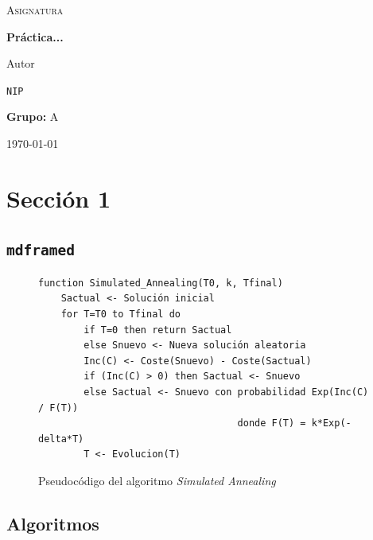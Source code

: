\documentclass[11pt]{article}
\begin{document}
    
\begin{titlepage}
	\centering
	{\scshape \LARGE Asignatura \par}
	\vspace{1cm}
	{\huge\bfseries Práctica... \par}
	\vspace{2cm}
	{\Large Autor} \par
    \texttt{NIP} \par
	\vspace{2cm}
    \textbf{Grupo: }A
    \vfill
    {\Large \today \par}
\end{titlepage}


\thispagestyle{empty}
\tableofcontents

\newpage

\section{Sección 1}

\subsection{\texttt{mdframed}}

\begin{figure}[h!] 
    \center
    \begin{mdframed}[style=code, nobreak=false]
\begin{verbatim}
function Simulated_Annealing(T0, k, Tfinal)
    Sactual <- Solución inicial
    for T=T0 to Tfinal do
        if T=0 then return Sactual
        else Snuevo <- Nueva solución aleatoria
        Inc(C) <- Coste(Snuevo) - Coste(Sactual)
        if (Inc(C) > 0) then Sactual <- Snuevo
        else Sactual <- Snuevo con probabilidad Exp(Inc(C) / F(T))
                                   donde F(T) = k*Exp(-delta*T)
        T <- Evolucion(T)
\end{verbatim}
    \end{mdframed}
    \caption{Pseudocódigo del algoritmo \textit{Simulated Annealing}}
\end{figure}

\subsection{Algoritmos}
\end{document}
